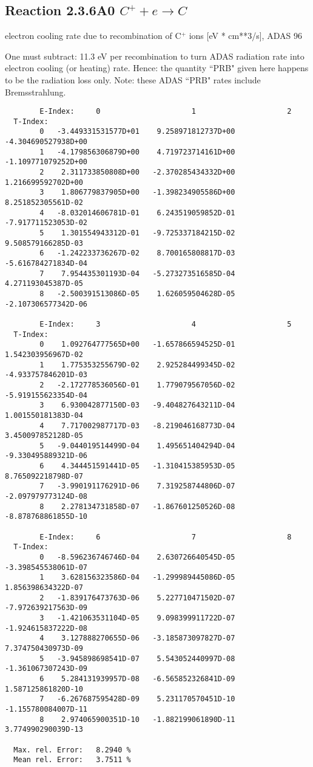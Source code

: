 \documentclass[12pt,dvipdfmx]{article}
\begin{document}
\subsection{
  Reaction 2.3.6A0  $C^+ + e \rightarrow C  $
}
electron cooling rate due to recombination of C$^+$ ions [eV * cm**3/s],
ADAS 96

One must subtract: 11.3 eV per recombination to turn ADAS radiation
rate into electron cooling (or heating) rate. Hence: the quantity
``PRB" given here happens to be the radiation loss only. Note: these
ADAS ``PRB" rates include Bremsstrahlung.

\begin{small}\begin{verbatim}
        E-Index:     0                     1                     2
  T-Index:
        0   -3.449331531577D+01    9.258971812737D+00   -4.304690527938D+00
        1   -4.179856306879D+00    4.719723714161D+00   -1.109771079252D+00
        2    2.311733850808D+00   -2.370285434332D+00    1.216699592702D+00
        3    1.806779837905D+00   -1.398234905586D+00    8.251852305561D-02
        4   -8.032014606781D-01    6.243519059852D-01   -7.917711523053D-02
        5    1.301554943312D-01   -9.725337184215D-02    9.508579166285D-03
        6   -1.242233736267D-02    8.700165808817D-03   -5.616784271834D-04
        7    7.954435301193D-04   -5.273273516585D-04    4.271193045387D-05
        8   -2.500391513086D-05    1.626059504628D-05   -2.107306577342D-06

        E-Index:     3                     4                     5
  T-Index:
        0    1.092764777565D+00   -1.657866594525D-01    1.542303956967D-02
        1    1.775353255679D-02    2.925284499345D-02   -4.933757846201D-03
        2   -2.172778536056D-01    1.779079567056D-02   -5.919155623354D-04
        3    6.930042877150D-03   -9.404827643211D-04    1.001550181383D-04
        4    7.717002987717D-03   -8.219046168773D-04    3.450097852128D-05
        5   -9.044019514499D-04    1.495651404294D-04   -9.330495889321D-06
        6    4.344451591441D-05   -1.310415385953D-05    8.765092218798D-07
        7   -3.990191176291D-06    7.319258744806D-07   -2.097979773124D-08
        8    2.278134731858D-07   -1.867601250526D-08   -8.878768861855D-10

        E-Index:     6                     7                     8
  T-Index:
        0   -8.596236746746D-04    2.630726640545D-05   -3.398545538061D-07
        1    3.628156323586D-04   -1.299989445086D-05    1.856398634322D-07
        2   -1.839176473763D-06    5.227710471502D-07   -7.972639217563D-09
        3   -1.421063531104D-05    9.098399911722D-07   -1.924615837222D-08
        4    3.127888270655D-06   -3.185873097827D-07    7.374750430973D-09
        5   -3.945898698541D-07    5.543052440997D-08   -1.361067307243D-09
        6    5.284131939957D-08   -6.565852326841D-09    1.587125861820D-10
        7   -6.267687595428D-09    5.231170570451D-10   -1.155780084007D-11
        8    2.974065900351D-10   -1.882199061890D-11    3.774990290039D-13

  Max. rel. Error:   8.2940 %
  Mean rel. Error:   3.7511 %



\end{verbatim}\end{small}
\end{document}
